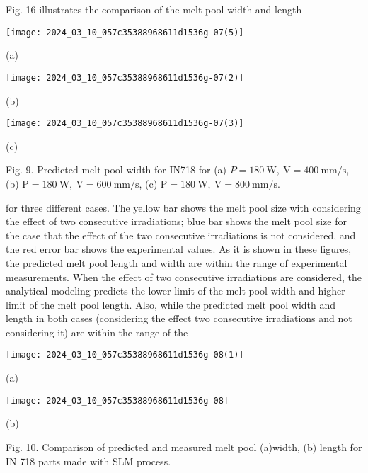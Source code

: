 \documentclass[10pt]{article}
\begin{document}
Fig. 16 illustrates the comparison of the melt pool width and length

\begin{center}
\texttt{[image: 2024\_03\_10\_057c35388968611d1536g-07(5)]}
\end{center}

(a)

\begin{center}
\texttt{[image: 2024\_03\_10\_057c35388968611d1536g-07(2)]}
\end{center}

(b)

\begin{center}
\texttt{[image: 2024\_03\_10\_057c35388968611d1536g-07(3)]}
\end{center}

(c)

Fig. 9. Predicted melt pool width for IN718 for (a) $P=180 \mathrm{~W}, \mathrm{~V}=400 \mathrm{~mm} / \mathrm{s}$, (b) $\mathrm{P}=180 \mathrm{~W}, \mathrm{~V}=600 \mathrm{~mm} / \mathrm{s}$, (c) $\mathrm{P}=180 \mathrm{~W}, \mathrm{~V}=800 \mathrm{~mm} / \mathrm{s}$.

for three different cases. The yellow bar shows the melt pool size with considering the effect of two consecutive irradiations; blue bar shows the melt pool size for the case that the effect of the two consecutive irradiations is not considered, and the red error bar shows the experimental values. As it is shown in these figures, the predicted melt pool length and width are within the range of experimental measurements. When the effect of two consecutive irradiations are considered, the analytical modeling predicts the lower limit of the melt pool width and higher limit of the melt pool length. Also, while the predicted melt pool width and length in both cases (considering the effect two consecutive irradiations and not considering it) are within the range of the

\begin{center}
\texttt{[image: 2024\_03\_10\_057c35388968611d1536g-08(1)]}
\end{center}

(a)

\begin{center}
\texttt{[image: 2024\_03\_10\_057c35388968611d1536g-08]}
\end{center}

(b)

Fig. 10. Comparison of predicted and measured melt pool (a)width, (b) length for IN 718 parts made with SLM process.
\end{document}
